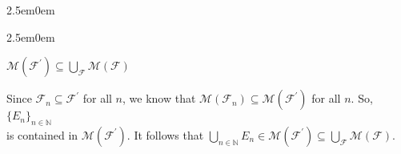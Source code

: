 \documentclass{book}
\newcommand{\hOne}{%
   \color{Black}%
   \fontsize{14}{16}\selectfont%
}
\newenvironment{myIndent}{%
   \begin{adjustwidth}{2.5em}{0em}%
}{%
   \end{adjustwidth}%
}
\newcommand{\mySepTwo}[1][.]{%
   {\noindent\color{#1}{\rule{6.5in}{0.5mm}}}\\%
}
\newcommand{\retTwo}{\hfill\bigbreak}
\begin{document}
\begin{myIndent}
\begin{myIndent}
      {\centering $\mathcal{M}(\mathcal{F}^\prime) \subseteq \bigcup_\mathcal{F}\mathcal{M}(\mathcal{F})$ \retTwo\par}

      Since $\mathcal{F}_n \subseteq \mathcal{F}^\prime$ for all $n$, we know that $\mathcal{M}(\mathcal{F}_n) \subseteq \mathcal{M}(\mathcal{F}^\prime)$ for all $n$. So, $\{E_n\}_{n \in \mathbb{N}}$\\ is contained in $\mathcal{M}(\mathcal{F}^\prime)$. It follows that $\bigcup\limits_{n \in \mathbb{N}}E_n \in \mathcal{M}(\mathcal{F}^\prime) \subseteq \bigcup_\mathcal{F}\mathcal{M}(\mathcal{F})$.\retTwo
   \end{myIndent}

   \mySepTwo
   
   \newpage\hOne




\end{myIndent}
\end{document}
